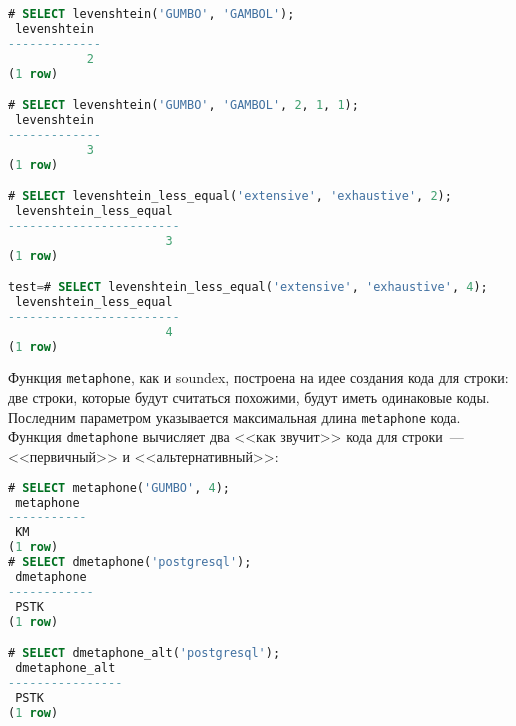 \begin{lstlisting}[language=SQL,label=lst:ext_fuzzystrmatch2,caption=levenshtein]
# SELECT levenshtein('GUMBO', 'GAMBOL');
 levenshtein
-------------
           2
(1 row)

# SELECT levenshtein('GUMBO', 'GAMBOL', 2, 1, 1);
 levenshtein
-------------
           3
(1 row)

# SELECT levenshtein_less_equal('extensive', 'exhaustive', 2);
 levenshtein_less_equal
------------------------
                      3
(1 row)

test=# SELECT levenshtein_less_equal('extensive', 'exhaustive', 4);
 levenshtein_less_equal
------------------------
                      4
(1 row)
\end{lstlisting}

Функция \lstinline!metaphone!, как и soundex, построена на идее создания кода для строки: две строки, которые будут считаться похожими, будут иметь одинаковые коды. Последним параметром указывается максимальная длина \lstinline!metaphone! кода. Функция \lstinline!dmetaphone! вычисляет два <<как звучит>> кода для строки~--- <<первичный>> и <<альтернативный>>:

\begin{lstlisting}[language=SQL,label=lst:ext_fuzzystrmatch3,caption=metaphone]
# SELECT metaphone('GUMBO', 4);
 metaphone
-----------
 KM
(1 row)
# SELECT dmetaphone('postgresql');
 dmetaphone
------------
 PSTK
(1 row)

# SELECT dmetaphone_alt('postgresql');
 dmetaphone_alt
----------------
 PSTK
(1 row)
\end{lstlisting}

